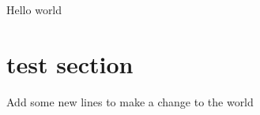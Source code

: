 \documentclass{article}
\begin{document}
	Hello world
	
	\section{test section}
	
	Add some new lines to make a change to the world
\end{document}
